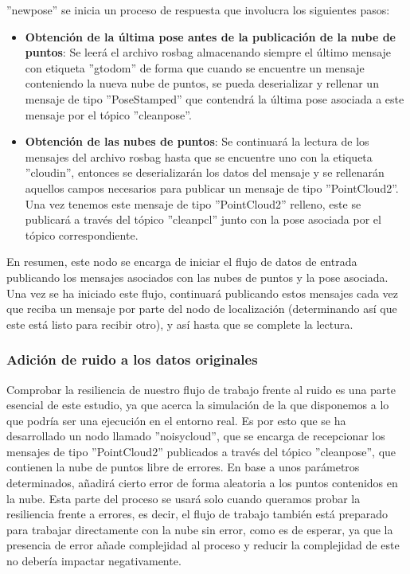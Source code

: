 \documentclass[12pt, a4paper, twoside]{article}
\begin{document}
\begin{itemize}
  ''new\textunderscore pose'' se inicia un proceso de respuesta que involucra los siguientes pasos:
  \begin{itemize}
    \item \textbf{Obtención de la última pose antes de la publicación de la nube de puntos}: Se leerá el archivo rosbag almacenando siempre el último mensaje con etiqueta 
    ''gt\textunderscore odom'' de forma que cuando se encuentre un mensaje conteniendo la nueva nube de puntos, se pueda deserializar y rellenar un mensaje de tipo ''PoseStamped'' 
    que contendrá la última pose asociada a este mensaje por el tópico ''clean\textunderscore pose''.
    \item \textbf{Obtención de las nubes de puntos}: Se continuará la lectura de los mensajes del archivo rosbag hasta que se encuentre uno con la etiqueta 
    ''cloud\textunderscore in'', entonces se deserializarán los datos del mensaje y se rellenarán aquellos campos necesarios para publicar un mensaje de tipo ''PointCloud2''.
    Una vez tenemos este mensaje de tipo ''PointCloud2'' relleno, este se publicará a través del tópico ''clean\textunderscore pcl'' junto con la pose asociada por el tópico 
    correspondiente.
  \end{itemize}
\end{itemize}
En resumen, este nodo se encarga de iniciar el flujo de datos de entrada publicando los mensajes asociados con las nubes de puntos y la pose asociada. Una vez se ha iniciado
este flujo, continuará publicando estos mensajes cada vez que reciba un mensaje por parte del nodo de localización (determinando así que este está listo para recibir otro),
y así hasta que se complete la lectura.

\subsubsection{Adición de ruido a los datos originales}
Comprobar la resiliencia de nuestro flujo de trabajo frente al ruido es una parte esencial de este estudio, ya que acerca la simulación de la que disponemos 
a lo que podría ser una ejecución en el entorno real. Es por esto que se ha desarrollado un nodo llamado ''noisy\textunderscore cloud'', que se encarga de recepcionar 
los mensajes de tipo ''PointCloud2'' publicados a través del tópico ''clean\textunderscore pose'', que contienen la nube de puntos libre de errores. En base a unos 
parámetros determinados, añadirá cierto error de forma aleatoria a los puntos contenidos en la nube. Esta parte del proceso se usará solo cuando queramos probar la 
resiliencia frente a errores, es decir, el flujo de trabajo también está preparado para trabajar directamente con la nube sin error, como es de esperar, ya que la 
presencia de error añade complejidad al proceso y reducir la complejidad de este no debería impactar negativamente.
\end{document}
